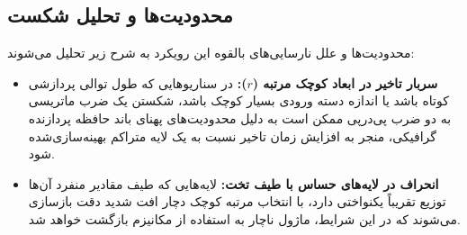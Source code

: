 \subsection{محدودیت‌ها و تحلیل شکست}
محدودیت‌ها و علل نارسایی‌های بالقوه این رویکرد به شرح زیر تحلیل می‌شوند:
\begin{itemize}
    \item \textbf{سربار تاخیر در ابعاد کوچک مرتبه ($r$):} در سناریوهایی که طول توالی پردازشی کوتاه باشد یا اندازه دسته ورودی بسیار کوچک باشد، شکستن یک ضرب ماتریسی به دو ضرب پی‌درپی ممکن است به دلیل محدودیت‌های پهنای باند حافظه پردازنده گرافیکی، منجر به افزایش زمان تاخیر نسبت به یک لایه متراکم بهینه‌سازی‌شده شود.
    \item \textbf{انحراف در لایه‌های حساس با طیف تخت:} لایه‌هایی که طیف مقادیر منفرد آن‌ها توزیع تقریباً یکنواختی دارد، با انتخاب مرتبه کوچک دچار افت شدید دقت بازسازی می‌شوند که در این شرایط، ماژول ناچار به استفاده از مکانیزم بازگشت خواهد شد.
\end{itemize}
